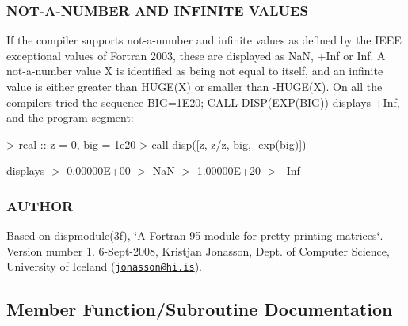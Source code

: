 \subsubsection*{N\+O\+T-\/\+A-\/\+N\+U\+M\+B\+ER A\+ND I\+N\+F\+I\+N\+I\+TE V\+A\+L\+U\+ES}

If the compiler supports not-\/a-\/number and infinite values as defined by the I\+E\+EE exceptional values of Fortran 2003, these are displayed as NaN, +\+Inf or Inf. A not-\/a-\/number value X is identified as being not equal to itself, and an infinite value is either greater than H\+U\+G\+E(\+X) or smaller than -\/\+H\+U\+GE(X). On all the compilers tried the sequence B\+IG=1\+E20; C\+A\+LL D\+I\+S\+P(\+E\+X\+P(\+B\+I\+G)) displays +\+Inf, and the program segment\+: \begin{DoxyVerb}> real :: z = 0, big = 1e20
> call disp([z, z/z, big, -exp(big)])
\end{DoxyVerb}


displays $>$ 0.\+00000E+00 $>$ NaN $>$ 1.\+00000E+20 $>$ -\/\+Inf

\subsubsection*{A\+U\+T\+H\+OR}

Based on dispmodule(3f), \char`\"{}\+A Fortran 95 module for pretty-\/printing matrices\char`\"{}. Version number 1. 6-\/\+Sept-\/2008, Kristjan Jonasson, Dept. of Computer Science, University of Iceland (\href{mailto:jonasson@hi.is}{\tt jonasson@hi.\+is}). 

\subsection{Member Function/\+Subroutine Documentation}
\mbox{\label{interfacem__display_1_1disp_a2944f5c9f6a1390fddfbe38f59d4872d}} 
